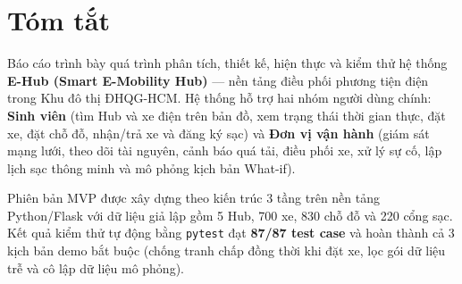 \section*{Tóm tắt}

Báo cáo trình bày quá trình phân tích, thiết kế, hiện thực và kiểm thử hệ thống \textbf{E-Hub (Smart E-Mobility Hub)} --- nền tảng điều phối phương tiện điện trong Khu đô thị ĐHQG-HCM. Hệ thống hỗ trợ hai nhóm người dùng chính: \textbf{Sinh viên} (tìm Hub và xe điện trên bản đồ, xem trạng thái thời gian thực, đặt xe, đặt chỗ đỗ, nhận/trả xe và đăng ký sạc) và \textbf{Đơn vị vận hành} (giám sát mạng lưới, theo dõi tài nguyên, cảnh báo quá tải, điều phối xe, xử lý sự cố, lập lịch sạc thông minh và mô phỏng kịch bản What-if).

Phiên bản MVP được xây dựng theo kiến trúc 3 tầng trên nền tảng Python/Flask với dữ liệu giả lập gồm 5 Hub, 700 xe, 830 chỗ đỗ và 220 cổng sạc. Kết quả kiểm thử tự động bằng \texttt{pytest} đạt \textbf{87/87 test case} và hoàn thành cả 3 kịch bản demo bắt buộc (chống tranh chấp đồng thời khi đặt xe, lọc gói dữ liệu trễ và cô lập dữ liệu mô phỏng).
